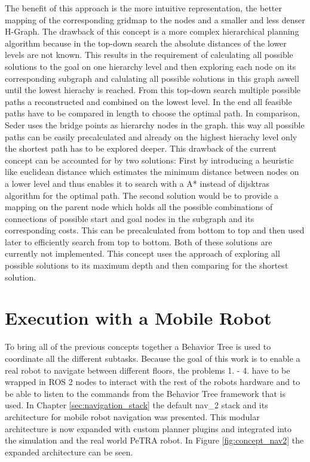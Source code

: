 The benefit of this approach is the more intuitive representation, the better mapping of the corresponding gridmap to the nodes and a smaller and less denser H-Graph. The drawback of this concept is a more complex hierarchical planning algorithm because in the top-down search the absolute distances of the lower levels are not known. This results in the requirement of calculating all possible solutions to the goal on one hierarchy level and then exploring each node on its corresponding subgraph and calulating all possible solutions in this graph aswell until the lowest hierachy is reached. From this top-down search multiple possible paths a reconstructed and combined on the lowest level. In the end all feasible paths have to be compared in length to choose the optimal path. In comparison, Seder \cite{seder_hierarchical_2011} uses the bridge points as hierarchy nodes in the graph. this way all possible paths can be easily precalculated and already on the highest hierachy level only the shortest path has to be explored deeper. This drawback of the current concept can be accounted for by two solutions: First by introducing a heuristic like euclidean distance which estimates the minimum distance between nodes on a lower level and thus enables it to search with a A* instead of dijsktras algorithm for the optimal path. The second solution would be to provide a mapping on the parent node which holds all the possible combinations of connections of possible start and goal nodes in the subgraph and its corresponding costs. This can be precalculated from bottom to top and then used later to efficiently search from top to bottom. Both of these solutions are currently not implemented. This concept uses the approach of exploring all possible solutions to its maximum depth and then comparing for the shortest solution.

\section{Execution with a Mobile Robot}
\label{sec:execution}
To bring all of the previous concepts together a Behavior Tree is used to coordinate all the different subtasks. Because the goal of this work is to enable a real robot to navigate between different floors, the problems 1. - 4. have to be wrapped in ROS 2 nodes to interact with the rest of the robots hardware and to be able to listen to the commands from the Behavior Tree framework that is used. In Chapter \ref{sec:navigation_stack} the default \gls{nav_2} stack and its architecture for mobile robot navigation was presented. This modular architecture is now expanded with custom planner plugins and integrated into the simulation and the real world PeTRA robot. In Figure \ref{fig:concept_nav2} the expanded architecture can be seen. 

